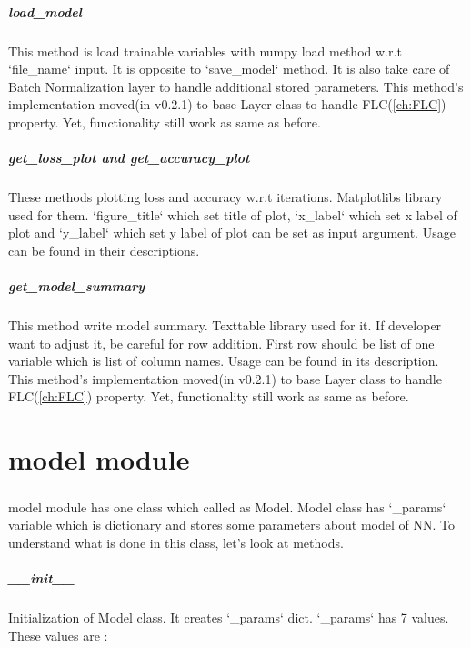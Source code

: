 \documentclass[12pt]{report}
\begin{document}
\paragraph{load\_model}
This method is load trainable variables with numpy load method w.r.t `file\_name` input. It is opposite to `save\_model` method. It is also take care of Batch Normalization layer to handle additional stored parameters. This method's implementation moved(in v0.2.1) to base Layer class to handle FLC(\ref{ch:FLC}) property. Yet, functionality still work as same as before.

\paragraph{get\_loss\_plot and get\_accuracy\_plot}
These methods plotting loss and accuracy w.r.t iterations. Matplotlibs library used for them. `figure\_title` which set title of plot, `x\_label` which set x label of plot and `y\_label` which set y label of plot can be set as input argument. Usage can be found in their descriptions.

\paragraph{get\_model\_summary}
This method write model summary. Texttable library used for it. If developer want to adjust it, be careful for row addition. First row should be list of one variable which is list of column names. Usage can be found in its description. This method's implementation moved(in v0.2.1) to base Layer class to handle FLC(\ref{ch:FLC}) property. Yet, functionality still work as same as before.





\chapter{model module}

\paragraph{}
model module has one class which called as Model. Model class has `\_params` variable which is dictionary and stores some parameters about model of NN. To understand what is done in this class, let's look at methods.

\paragraph{\_\_init\_\_}
Initialization of Model class. It creates `\_params` dict. `\_params` has 7 values. These values are :
\end{document}
